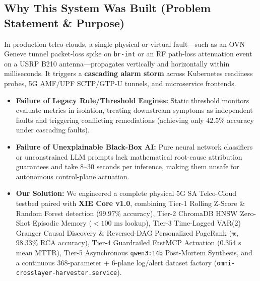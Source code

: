\documentclass[11pt,a4paper]{article}
\begin{document}
\subsection{Why This System Was Built (Problem Statement \& Purpose)}
In production telco clouds, a single physical or virtual fault---such as an OVN Geneve tunnel packet-loss spike on \texttt{br-int} or an RF path-loss attenuation event on a USRP B210 antenna---propagates vertically and horizontally within milliseconds. It triggers a \textbf{cascading alarm storm} across Kubernetes readiness probes, 5G AMF/UPF SCTP/GTP-U tunnels, and microservice frontends.
\begin{itemize}
    \item \textbf{Failure of Legacy Rule/Threshold Engines:} Static threshold monitors evaluate metrics in isolation, treating downstream symptoms as independent faults and triggering conflicting remediations (achieving only $42.5\%$ accuracy under cascading faults).
    \item \textbf{Failure of Unexplainable Black-Box AI:} Pure neural network classifiers or unconstrained LLM prompts lack mathematical root-cause attribution guarantees and take $8$--$30$ seconds per inference, making them unsafe for autonomous control-plane actuation.
    \item \textbf{Our Solution:} We engineered a complete physical 5G SA Telco-Cloud testbed paired with \textbf{XIE Core v1.0}, combining Tier-1 Rolling Z-Score \& Random Forest detection ($99.97\%$ accuracy), Tier-2 ChromaDB HNSW Zero-Shot Episodic Memory ($<100\text{ ms}$ lookup), Tier-3 Time-Lagged VAR(2) Granger Causal Discovery \& Reversed-DAG Personalized PageRank ($\boldsymbol{\pi}$, $98.33\%$ RCA accuracy), Tier-4 Guardrailed FastMCP Actuation ($0.354\text{ s}$ mean MTTR), Tier-5 Asynchronous \texttt{qwen3:14b} Post-Mortem Synthesis, and a continuous 368-parameter + 6-plane log/alert dataset factory (\texttt{omni-crosslayer-harvester.service}).
\end{itemize}
\end{document}
